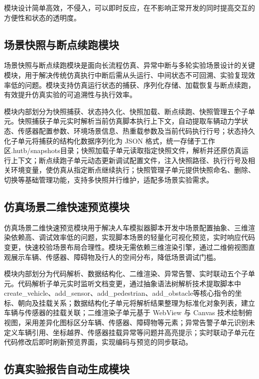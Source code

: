 模块设计简单高效，不侵入，可以即时反应，在不影响正常开发的同时提高交互的方便性和状态的透明度。

\subsection{场景快照与断点续跑模块}

场景快照与断点续跑模块是面向长流程仿真、异常中断与多轮实验场景设计的关键模块，用于解决传统仿真执行中断后需从头运行、中间状态不可回溯、实验复现效率低的问题。模块支持仿真运行状态的捕获、序列化存储、加载恢复与断点续跑，有效提升仿真实验的可追溯性与执行效率。

模块内部划分为快照捕获、状态持久化、快照加载、断点续跑、快照管理五个子单元。快照捕获子单元实时解析当前仿真脚本执行上下文，自动提取车辆动力学状态、传感器配置参数、环境场景信息、热重载参数及当前代码执行行号；状态持久化子单元将捕获的结构化数据序列化为
JSON
格式，统一存储于工作区.hutb/snapshots目录；快照加载子单元读取指定快照文件，解析并还原仿真运行上下文；断点续跑子单元动态更新调试配置文件，注入快照路径、执行行号及相关环境变量，使仿真从指定断点继续执行；快照管理子单元提供快照命名、删除、切换等基础管理功能，支持多快照并行维护，适配多场景实验需求。

\subsection{仿真场景二维快速预览模块}

仿真场景二维快速预览模块用于解决人车模拟器脚本开发中场景配置抽象、三维渲染依赖高、调试效率低的问题，实现脚本场景的轻量化可视化预览，实时响应代码变更，快速校验场景布局合理性。模块无需依赖三维渲染引擎，通过二维俯视图直观展示车辆、传感器、障碍物及行人的空间分布，降低场景调试门槛。

模块内部划分为代码解析、数据结构化、二维渲染、异常告警、实时联动五个子单元。代码解析子单元实时监听文档变更，通过抽象语法树解析技术提取脚本中create\_vehicle、add\_sensor、add\_pedestrian、add\_obstacle等核心指令的坐标、朝向及挂载关系；数据结构化子单元将解析结果整理为标准化对象列表，建立车辆与传感器的挂载关联；二维渲染子单元基于
WebView 与 Canvas
技术绘制俯视图，采用差异化图标区分车辆、传感器、障碍物等元素；异常告警子单元识别未定义车辆引用、坐标越界、传感器挂载异常等问题并高亮提示；实时联动子单元在代码修改后即时刷新预览界面，实现编码与预览的同步联动。

\subsection{仿真实验报告自动生成模块}

